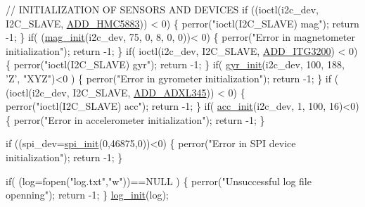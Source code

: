 \begin{DoxyCode}
\textcolor{comment}{// INITIALIZATION OF SENSORS AND DEVICES}
  \textcolor{keywordflow}{if} ((ioctl(i2c\_dev, I2C\_SLAVE, \hyperlink{imu__functions_01_07C_xC3_xB3pia_01em_01conflito_01de_01Andr_xC3_xA9_01Carvalho_012013-04-26_08_8h_a383c09d3e3bbe30097f7eb8d081fb856}{ADD\_HMC5883})) < 0) \{
                perror(\textcolor{stringliteral}{"ioctl(I2C\_SLAVE) mag"});
                \textcolor{keywordflow}{return} -1;
  \}
  \textcolor{keywordflow}{if}( (\hyperlink{imu__functions_01_07C_xC3_xB3pia_01em_01conflito_01de_01Andr_xC3_xA9_01Carvalho_012013-04-26_08_8h_a014f908c9faa37c1ec75177a17012a01}{mag\_init}(i2c\_dev, 75, 0, 8, 0, 0))< 0)
  \{
      perror(\textcolor{stringliteral}{"Error in magnetometer initialization"});
      \textcolor{keywordflow}{return} -1;
  \}
  \textcolor{keywordflow}{if}( ioctl(i2c\_dev, I2C\_SLAVE, \hyperlink{imu__functions_01_07C_xC3_xB3pia_01em_01conflito_01de_01Andr_xC3_xA9_01Carvalho_012013-04-26_08_8h_ab9fd1068a3f5fcba24d92918aaf0dcb5}{ADD\_ITG3200}) < 0) \{
                perror(\textcolor{stringliteral}{"ioctl(I2C\_SLAVE) gyr"});
                \textcolor{keywordflow}{return} -1;
  \} 
  \textcolor{keywordflow}{if}( \hyperlink{group__gyr_ga6d02be352b4491a236c9695a6a24d174}{gyr\_init}(i2c\_dev, 100, 188, \textcolor{charliteral}{'Z'}, \textcolor{stringliteral}{"XYZ"})<0 )
  \{
      perror(\textcolor{stringliteral}{"Error in gyrometer initialization"});
      \textcolor{keywordflow}{return} -1;
  \}
  \textcolor{keywordflow}{if} ( (ioctl(i2c\_dev, I2C\_SLAVE, \hyperlink{imu__functions_01_07C_xC3_xB3pia_01em_01conflito_01de_01Andr_xC3_xA9_01Carvalho_012013-04-26_08_8h_a909f4a5773e20e672cdb4088e1cfa22f}{ADD\_ADXL345})) < 0) \{
        perror(\textcolor{stringliteral}{"ioctl(I2C\_SLAVE) acc"});
        \textcolor{keywordflow}{return} -1;
  \}  
  \textcolor{keywordflow}{if}( \hyperlink{group__acc_gae8f9cc6e0d15e61039d846305f86f073}{acc\_init}(i2c\_dev, 1, 100, 16)<0)
  \{
        perror(\textcolor{stringliteral}{"Error in accelerometer initialization"});
        \textcolor{keywordflow}{return} -1;
  \}

  \textcolor{keywordflow}{if} ((spi\_dev=\hyperlink{spi__functions_01_07C_xC3_xB3pia_01em_01conflito_01de_01Andr_xC3_xA9_01Carvalho_012013-04-26_08_8c_a70764aca888e93b0329e7a62c9312704}{spi\_init}(0,46875,0))<0) 
  \{
    perror(\textcolor{stringliteral}{"Error in SPI device initialization"});
    \textcolor{keywordflow}{return} -1;
  \}
  
  \textcolor{keywordflow}{if}( (log=fopen(\textcolor{stringliteral}{"log.txt"},\textcolor{stringliteral}{"w"}))==NULL )
  \{
    perror(\textcolor{stringliteral}{"Unsuccessful log file openning"});
    \textcolor{keywordflow}{return} -1;
  \}
  \hyperlink{main_01_07Caio_01Gustavo_01Mesquita_01Angelo's_01conflicted_01copy_012012-11-23_08_8c_aa570d24f638774bf52f70f1d9d9d45f8}{log\_init}(log);
  

\end{DoxyCode}
